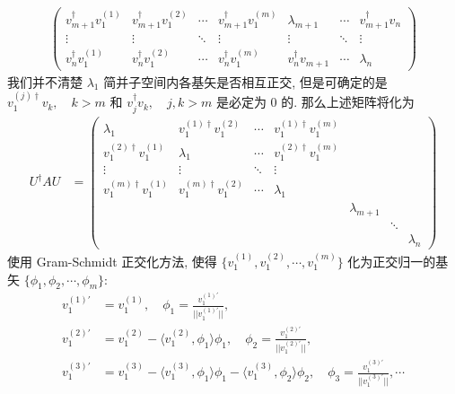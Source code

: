 \documentclass[../../main.tex]{subfiles}
\begin{document}
\begin{enumerate}
{{\begin{enumerate}
\begin{align*}
\begin{pmatrix}
          v_{m+1}^{\dagger}v_{1}^{(1)} & v_{m+1}^{\dagger}v_{1}^{(2)} & \cdots & v_{m+1}^{\dagger}v_{1}^{(m)} & \lambda_{m+1} & \cdots & v_{m+1}^{\dagger}v_{n} \\
          \vdots & \vdots & \ddots & \vdots & \vdots & \ddots & \vdots \\
          v_{n}^{\dagger}v_{1}^{(1)} & v_{n}^{\dagger}v_{1}^{(2)} & \cdots & v_{n}^{\dagger}v_{1}^{(m)} & v_{n}^{\dagger}v_{m+1} & \cdots & \lambda_{n}
        \end{pmatrix}
      \end{align*}
      我们并不清楚 $\lambda_{1}$ 简并子空间内各基矢是否相互正交, 但是可确定的是 $v_{1}^{(j)\dagger}v_{k},\quad k>m$ 和 $v_{j}^{\dagger}v_{k},\quad j,k>m$ 是必定为 $0$ 的. 那么上述矩阵将化为
      \begin{align*}
        U^{\dagger}AU &= \begin{pmatrix}
          \lambda_{1} & v_{1}^{(1)\dagger}v_{1}^{(2)} & \cdots & v_{1}^{(1)\dagger}v_{1}^{(m)} &  &  &  \\
          v_{1}^{(2)\dagger}v_{1}^{(1)} & \lambda_{1} & \cdots & v_{1}^{(2)\dagger}v_{1}^{(m)} &  &  &  \\
          \vdots & \vdots & \ddots & \vdots &  &  &  \\
          v_{1}^{(m)\dagger}v_{1}^{(1)} & v_{1}^{(m)\dagger}v_{1}^{(2)} & \cdots & \lambda_{1} &  &  &  \\
           &  &  &  & \lambda_{m+1} &  &  \\
           &  &  &  &  & \ddots &  \\
           &  &  &  &  &  & \lambda_{n}
        \end{pmatrix}
      \end{align*}
      使用 Gram-Schmidt 正交化方法, 使得 $\{v_{1}^{(1)},v_{1}^{(2)},\cdots,v_{1}^{(m)}\}$ 化为正交归一的基矢 $\{\phi_{1},\phi_{2},\cdots,\phi_{m}\}$: 
      \begin{align*}
        v_{1}^{(1)\prime} &= v_{1}^{(1)},\quad \phi_{1} = \frac{v_{1}^{(1)\prime}}{||v_{1}^{(1)\prime}||},\\
        v_{1}^{(2)\prime} &= v_{1}^{(2)} - \langle v_{1}^{(2)},\phi_{1}\rangle\phi_{1},\quad \phi_{2} = \frac{v_{1}^{(2)\prime}}{||v_{1}^{(2)\prime}||},\\
        v_{1}^{(3)\prime} &= v_{1}^{(3)} - \langle v_{1}^{(3)},\phi_{1}\rangle\phi_{1} - \langle v_{1}^{(3)},\phi_{2}\rangle\phi_{2},\quad \phi_{3} = \frac{v_{1}^{(3)\prime}}{||v_{1}^{(3)\prime}||},\cdots
      \end{align*}

\end{enumerate}}}
\end{enumerate}
\end{document}
